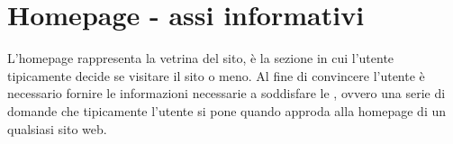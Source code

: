 \section{Homepage - assi informativi}
L’homepage rappresenta la vetrina del sito, è la sezione in cui l'utente 
tipicamente decide se visitare il sito o meno. 
Al fine di convincere l'utente è necessario fornire le informazioni 
necessarie a soddisfare le , ovvero una serie di domande
che tipicamente l'utente si pone quando approda alla homepage di un 
qualsiasi sito web. 
  
  
  
  
  
  
  
